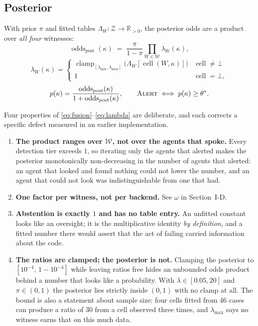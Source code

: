 \documentclass[conference]{IEEEtran}
\newcommand{\Wit}{\mathcal{W}}
\newcommand{\Cells}{\mathcal{Z}}
\newcommand{\LR}{\Lambda}
\newcommand{\clampop}{\operatorname{clamp}}
\newcommand{\cellop}{\operatorname{cell}}
\newcommand{\oddsop}{\operatorname{odds}}
\begin{document}
\subsection{Posterior}
With prior $\pi$ and fitted tables $\LR_W: \Cells \rightarrow \mathbb{R}_{>0}$, the posterior
odds are a product over \emph{all four} witnesses:
\begin{equation}
\oddsop_{\mathrm{post}}(\kappa) \;=\; \frac{\pi}{1-\pi} \prod_{W \in \Wit} \lambda_W(\kappa),
\label{eq:fusion}
\end{equation}
\begin{equation}
\lambda_W(\kappa) =
\begin{cases}
\clampop_{[\lambda_{\min},\lambda_{\max}]}\bigl(\LR_W[\cellop(W,\kappa)]\bigr) & \cellop \neq \bot\\[3pt]
1 & \cellop = \bot,
\end{cases}
\label{eq:lambda}
\end{equation}
\begin{equation}
p(\kappa)=\frac{\oddsop_{\mathrm{post}}(\kappa)}{1+\oddsop_{\mathrm{post}}(\kappa)},
\qquad \textsc{Alert} \iff p(\kappa) \ge \theta^{*}.
\label{eq:post}
\end{equation}

Four properties of \eqref{eq:fusion}--\eqref{eq:lambda} are deliberate, and each corrects a
specific defect measured in an earlier implementation.

\begin{enumerate}
\item \textbf{The product ranges over $\Wit$, not over the agents that spoke.} Every detection
tier exceeds $1$, so iterating only the agents that alerted makes the posterior monotonically
non-decreasing in the number of agents that alerted: an agent that looked and found nothing
could not lower the number, and an agent that could not look was indistinguishable from one
that had.
\item \textbf{One factor per witness, not per backend.} See $\omega$ in Section~I-D.
\item \textbf{Abstention is exactly $1$ and has no table entry.} An unfitted constant looks
like an oversight; it is the multiplicative identity \emph{by definition}, and a fitted number
there would assert that the act of failing carried information about the code.
\item \textbf{The ratios are clamped; the posterior is not.} Clamping the posterior to
$[10^{-4},\,1-10^{-4}]$ while leaving ratios free hides an unbounded odds product behind a
number that looks like a probability. With $\lambda \in [0.05, 20]$ and $\pi \in (0,1)$ the
posterior lies strictly inside $(0,1)$ with no clamp at all. The bound is also a statement
about sample size: four cells fitted from 46 cases can produce a ratio of $30$ from a cell
observed three times, and $\lambda_{\max}$ says no witness earns that on this much data.
\end{enumerate}
\end{document}
